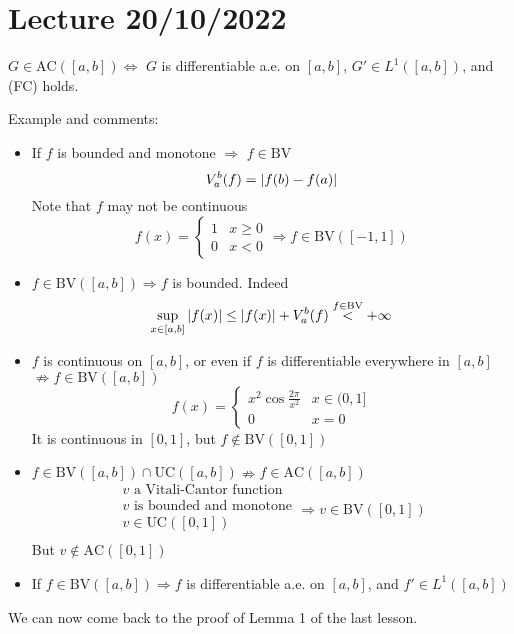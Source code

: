 \section{Lecture 20/10/2022}
\begin{theorem}
    \(G \in \mbox{AC}([a,b]) \Leftrightarrow\) \(G\) is differentiable a.e. on \([a,b]\), \(G' \in L^1([a,b])\), and (FC) holds.
\end{theorem}

Example and comments:
\begin{itemize}
    \item If \(f\) is bounded and monotone \(\Rightarrow\) \(f \in \mbox{BV}\)
    \[
        V_a^b (f) = \abs{f(b) - f(a)}
    \]
    Note that \(f\) may not be continuous
    \[
        f(x) = \begin{cases}
            1 & x \geq 0 \\
            0 & x < 0
        \end{cases}
        \Rightarrow f \in \mbox{BV}([-1,1])
    \]
    \item \(f \in \mbox{BV}([a,b]) \Rightarrow f\) is bounded. Indeed
    \[
        \sup_{x \in [a,b]} \abs{f(x)} \leq \abs{f(x)} + V_a^b(f) \overset{f \in \text{BV}}{<} +\infty
    \]
    \item \(f\) is continuous on \([a,b]\), or even if  \(f\) is differentiable everywhere in \([a,b]\) \(\nRightarrow f \in \mbox{BV}([a,b])\)
    \[
        f(x) = \begin{cases}
            x^2\cos{\frac{2\pi}{x^2}} & x \in (0,1] \\
            0 & x = 0
        \end{cases}
    \]
    It is continuous in \([0,1]\), but \(f \notin \mbox{BV}([0,1])\)
    \item \(f \in \mbox{BV}([a,b]) \cap \mbox{UC}([a,b])  \nRightarrow f \in \mbox{AC}([a,b])\)
    \[\begin{array}{l}
        v \mbox{ a Vitali-Cantor function} \\ v \mbox{ is bounded and monotone} \\ 
        v \in \mbox{UC}([0,1]) \\ 
        
    \end{array}
    \Rightarrow v \in \mbox{BV}([0,1]) 
    \]
    But \(v \not \in \mbox{AC}([0,1])\)
    \item If \(f \in \mbox{BV}([a,b]) \Rightarrow f\) is differentiable a.e. on \([a,b]\), and \(f' \in L^1([a,b])\)
\end{itemize}
We can now come back to the proof of Lemma 1 of the last lesson.

